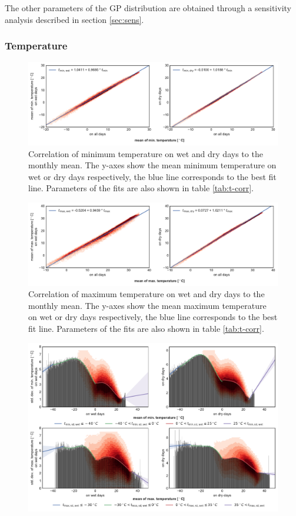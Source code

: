 \begin{refsection}
The other parameters of the GP distribution are obtained through a sensitivity analysis described in section \ref{sec:sens}.

\subsubsection{Temperature}

\begin{figure}
	\includegraphics[width=\linewidth]{gwgen-figures/f05.pdf}
	\caption[Correlation of minimum temperature on wet and dry days to the monthly mean]{Correlation of minimum temperature on wet and dry days to the monthly mean. The y-axes show the mean minimum temperature on wet or dry days respectively, the blue line corresponds to the best fit line. Parameters of the fits are also shown in table \ref{tab:t-corr}.}
	\label{fig:tmin}
\end{figure}
\begin{figure}
	\includegraphics[width=\linewidth]{gwgen-figures/f06.pdf}
	\caption[Correlation of maximum temperature on wet and dry days to the monthly mean]{Correlation of maximum temperature on wet and dry days to the monthly mean. The y-axes show the mean maximum temperature on wet or dry days respectively, the blue line corresponds to the best fit line. Parameters of the fits are also shown in table \ref{tab:t-corr}.}
	\label{fig:tmax}
\end{figure}
\begin{figure}
	\includegraphics[width=12cm]{gwgen-figures/f07.pdf}

\end{figure}
\end{refsection}
